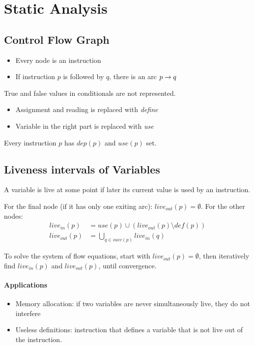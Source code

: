 \section{Static Analysis}

\subsection{Control Flow Graph}
\begin{itemize}
    \item Every node is an instruction
    \item If instruction $p$ is followed by $q$, there is an arc $p\rightarrow q$
\end{itemize}

True and false values in conditionals are not represented.
\begin{itemize}
    \item Assignment and reading is replaced with \emph{define}
    \item Variable in the right part is replaced with \emph{use}
\end{itemize}

Every instruction $p$ has $dep(p)$ and $use(p)$ set.

\subsection{Liveness intervals of Variables}
A variable is live at some point if later its current value is used by an instruction.

For the final node (if it has only one exiting arc): $live_{out}(p) = \emptyset$. For the other nodes:
\begin{align*}
    live_{in}(p) &= use(p) \cup (live_{out}(p) \setminus def(p)) \\
    live_{out}(p) &= \bigcup_{q\in succ(p)} live_{in}(q)
\end{align*}

To solve the system of flow equations, start with $live_{out}(p) = \emptyset$, then iteratively find $live_{in}(p)$ and $live_{out}(p)$, until convergence.

\paragraph{Applications}
\begin{itemize}
    \item Memory allocation: if two variables are never simultaneously live, they do not interfere
    \item Useless definitions: instruction that defines a variable that is not live out of the instruction.
\end{itemize}


